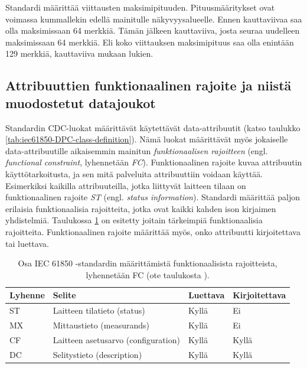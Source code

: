 Standardi määrittää viittausten maksimipituuden. Pituusmääritykset ovat voimassa kummallekin edellä mainitulle näkyvyysalueelle. Ennen kauttaviivaa saa olla maksimissaan 64 merkkiä. Tämän jälkeen kauttaviiva, josta seuraa uudelleen maksimissaan 64 merkkiä. Eli koko viittauksen maksimipituus saa olla enintään 129 merkkiä, kauttaviiva mukaan lukien. \mbox{\cite[s.~24,183]{IEC61850-7-2}}


\subsection{Attribuuttien funktionaalinen rajoite ja niistä muodostetut datajoukot}
\label{ch:fc-and-dataset}
Standardin CDC-luokat määrittävät käytettävät data-attribuutit (katso taulukko \ref{tab:iec61850-DPC-class-definition}). Nämä luokat määrittävät myös jokaiselle data-attribuutille aikaisemmin mainitun \emph{funktionaalisen rajoitteen} (engl. \emph{functional constraint}, lyhennetään \emph{FC}). Funktionaalinen rajoite kuvaa attribuutin käyttötarkoitusta, ja sen mitä palveluita attribuuttiin voidaan käyttää. Esimerkiksi kaikilla attribuuteilla, jotka liittyvät laitteen tilaan on funktionaalinen rajoite \emph{ST} (engl. \emph{status information}). Standardi määrittää paljon erilaisia funktionaalisia rajoitteita, jotka ovat kaikki kahden ison kirjaimen yhdistelmiä. Taulukossa \ref{tab:iec61850-functional-constraints} on esitetty joitain tärkeimpiä funktionaalisia rajoitteita. Funktionaalinen rajoite määrittää myös, onko attribuutti kirjoitettava tai luettava. \cite[s.~53--55]{IEC61850-7-2}

\begin{table}[ht!]
	\caption{Osa IEC 61850 -standardin määrittämistä funktionaalisista rajoitteista, lyhennetään FC (ote taulukosta \mbox{\cite[s.~54]{IEC61850-7-2}}).}
	\label{tab:iec61850-functional-constraints}
	\begin{tabular}{l | l | l | l}
		\hline
		\textbf{Lyhenne} & \textbf{Selite} & \textbf{Luettava} & \textbf{Kirjoitettava} \\
		\hline \hline
		ST & Laitteen tilatieto (status) & Kyllä & Ei \\
		MX & Mittaustieto (measurands) & Kyllä & Ei \\
		CF & Laitteen asetusarvo (configuration) & Kyllä & Kyllä \\
		DC & Selitystieto (description) & Kyllä & Kyllä \\
		\hline
	\end{tabular}
\end{table}

